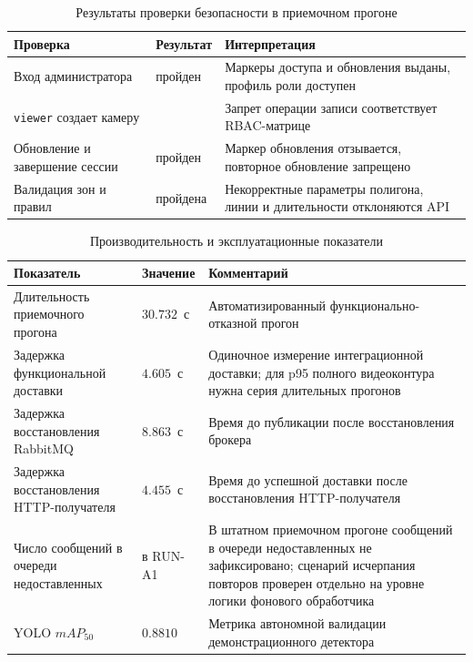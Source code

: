 \begin{table}[H]
\caption{Результаты проверки безопасности в приемочном прогоне}
\label{tab:security_results}
\begin{tabularx}{\textwidth}{>{\raggedright\arraybackslash}p{}>{\raggedright\arraybackslash}p{}>{\raggedright\arraybackslash}X}
\toprule
Проверка & Результат & Интерпретация \\
\midrule
Вход администратора & пройден & Маркеры доступа и обновления выданы, профиль роли доступен \\
\texttt{viewer} создает камеру & 403 & Запрет операции записи соответствует RBAC-матрице \\
Обновление и завершение сессии & пройден & Маркер обновления отзывается, повторное обновление запрещено \\
Валидация зон и правил & пройдена & Некорректные параметры полигона, линии и длительности отклоняются API \\
\bottomrule
\end{tabularx}
\end{table}

\begin{table}[H]
\caption{Производительность и эксплуатационные показатели}
\label{tab:perf_results}
\begin{tabularx}{\textwidth}{>{\raggedright\arraybackslash}p{}>{\raggedright\arraybackslash}p{}>{\raggedright\arraybackslash}X}
\toprule
Показатель & Значение & Комментарий \\
\midrule
Длительность приемочного прогона & \(30.732\)~с & Автоматизированный функционально-отказной прогон \\
Задержка функциональной доставки & \(4.605\)~с & Одиночное измерение интеграционной доставки; для p95 полного видеоконтура нужна серия длительных прогонов \\
Задержка восстановления RabbitMQ & \(8.863\)~с & Время до публикации после восстановления брокера \\
Задержка восстановления HTTP-получателя & \(4.455\)~с & Время до успешной доставки после восстановления HTTP-получателя \\
Число сообщений в очереди недоставленных & 0 в RUN-A1 & В штатном приемочном прогоне сообщений в очереди недоставленных не зафиксировано; сценарий исчерпания повторов проверен отдельно на уровне логики фонового обработчика \\
YOLO \(mAP_{50}\) & \(0.8810\) & Метрика автономной валидации демонстрационного детектора \\
\bottomrule
\end{tabularx}
\end{table}

